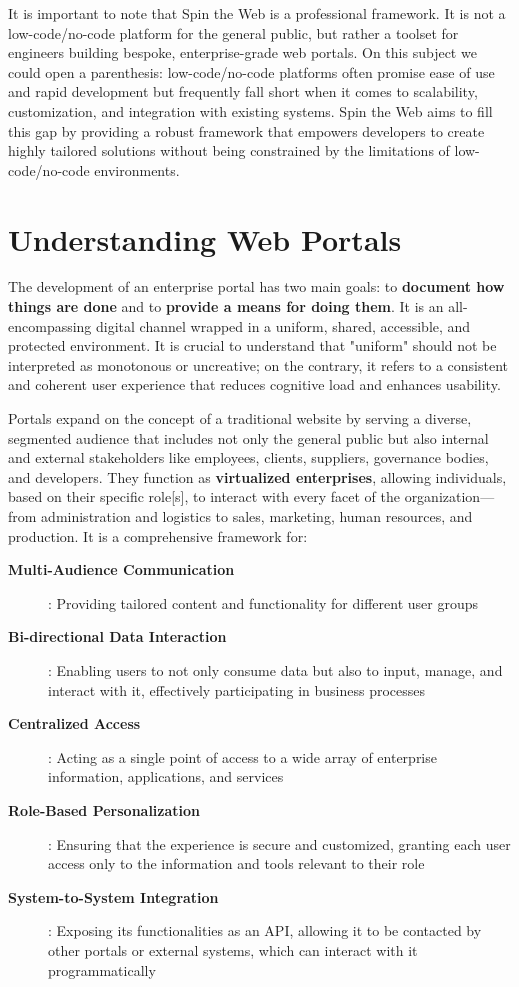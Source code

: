 It is important to note that Spin the Web is a professional framework. It is not a low-code/no-code platform for the general public, but rather a toolset for engineers building bespoke, enterprise-grade web portals. On this subject we could open a parenthesis: low-code/no-code platforms often promise ease of use and rapid development but frequently fall short when it comes to scalability, customization, and integration with existing systems. Spin the Web aims to fill this gap by providing a robust framework that empowers developers to create highly tailored solutions without being constrained by the limitations of low-code/no-code environments.

\section{Understanding Web Portals}
\label{sec:web-portals}

The development of an enterprise portal has two main goals: to \textbf{document how things are done} and to \textbf{provide a means for doing them}. It is an all-encompassing digital channel wrapped in a uniform, shared, accessible, and protected environment. It is crucial to understand that "uniform" should not be interpreted as monotonous or uncreative; on the contrary, it refers to a consistent and coherent user experience that reduces cognitive load and enhances usability.

Portals expand on the concept of a traditional website by serving a diverse, segmented audience that includes not only the general public but also internal and external stakeholders like employees, clients, suppliers, governance bodies, and developers. They function as \textbf{virtualized enterprises}, allowing individuals, based on their specific role[s], to interact with every facet of the organization—from administration and logistics to sales, marketing, human resources, and production. It is a comprehensive framework for:

\begin{description}
\item[\textbf{Multi-Audience Communication}]: Providing tailored content and functionality for different user groups
\item[\textbf{Bi-directional Data Interaction}]: Enabling users to not only consume data but also to input, manage, and interact with it, effectively participating in business processes
\item[\textbf{Centralized Access}]: Acting as a single point of access to a wide array of enterprise information, applications, and services
\item[\textbf{Role-Based Personalization}]: Ensuring that the experience is secure and customized, granting each user access only to the information and tools relevant to their role
\item[\textbf{System-to-System Integration}]: Exposing its functionalities as an API, allowing it to be contacted by other portals or external systems, which can interact with it programmatically
\end{description}

